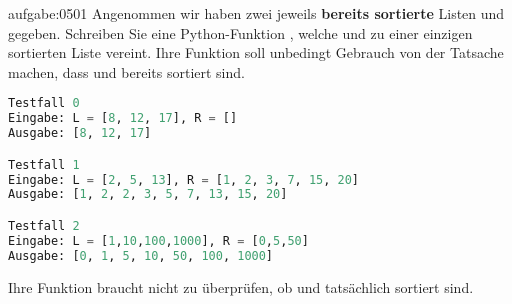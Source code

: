 \begin{aufgabe}{aufgabe:0501}
Angenommen wir haben zwei jeweils \textbf{bereits sortierte} Listen  und  gegeben. Schreiben Sie eine Python-Funktion , welche  und  zu einer einzigen sortierten Liste vereint. Ihre Funktion soll unbedingt Gebrauch von der Tatsache machen, dass  und  bereits sortiert sind.
\begin{lstlisting}[language=Python,caption=Testfälle für die Funktion \pythoninline{merge},numbers=none]
Testfall 0
Eingabe: L = [8, 12, 17], R = []
Ausgabe: [8, 12, 17]

Testfall 1
Eingabe: L = [2, 5, 13], R = [1, 2, 3, 7, 15, 20]
Ausgabe: [1, 2, 2, 3, 5, 7, 13, 15, 20]

Testfall 2
Eingabe: L = [1,10,100,1000], R = [0,5,50]
Ausgabe: [0, 1, 5, 10, 50, 100, 1000]
\end{lstlisting}
Ihre Funktion braucht nicht zu überprüfen, ob  und  tatsächlich sortiert sind.
\end{aufgabe}

